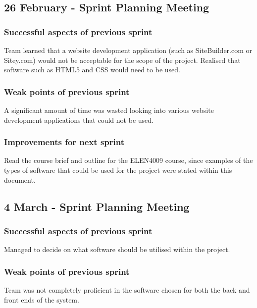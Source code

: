 \documentclass[journal,comsoc,onecolumn]{IEEEtran}
\begin{document}

\subsection{26 February - Sprint Planning Meeting}

\subsubsection{Successful aspects of previous sprint}
\hfill \break Team learned that a website development application (such as SiteBuilder.com or Sitey.com)  would not be acceptable for the scope of the project. Realised that software such as HTML5 and CSS would need to be used.

\subsubsection{Weak points of previous sprint}
\hfill \break A significant amount of time was wasted looking into various website development applications that could not be used.

\subsubsection{Improvements for next sprint}
\hfill \break Read the course brief and outline for the ELEN4009 course, since examples of the types of software that could be used for the project were stated within this document.


\subsection{4 March - Sprint Planning Meeting}

\subsubsection{Successful aspects of previous sprint}
\hfill \break Managed to decide on what software should be utilised within the project.

\subsubsection{Weak points of previous sprint}
\hfill \break Team was not completely proficient in the software chosen for both the back and front ends of the system.
\end{document}
